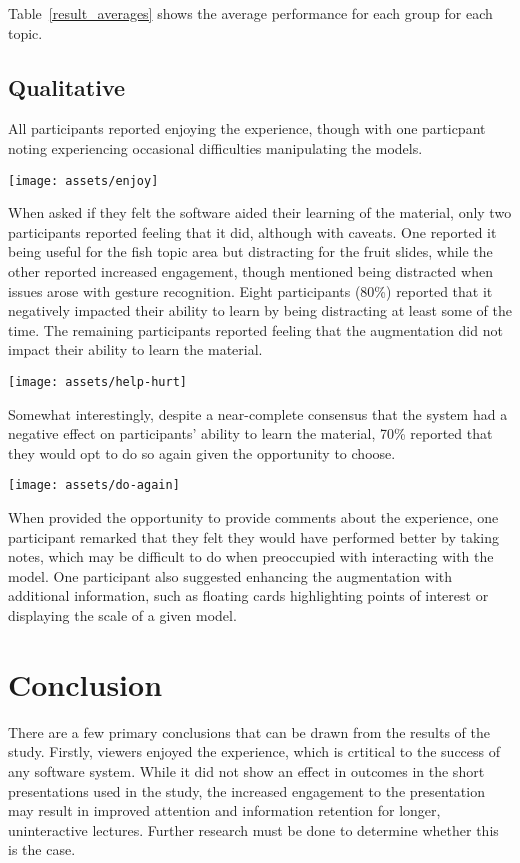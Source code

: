 \documentclass[10pt,journal]{IEEEtran}
\begin{document}
Table~\ref{result_averages} shows the average performance for each group for
each topic.

\subsection{Qualitative}

All participants reported enjoying the experience, though with one particpant
noting experiencing occasional difficulties manipulating the models.

\texttt{[image: assets/enjoy]}

When asked if they felt the software aided their learning of the material, only
two participants reported feeling that it did, although with caveats. One
reported it being useful for the fish topic area but distracting for the fruit
slides, while the other reported increased engagement, though mentioned being
distracted when issues arose with gesture recognition. Eight participants
(80\%) reported that it negatively impacted their ability to learn by being
distracting at least some of the time. The remaining participants reported
feeling that the augmentation did not impact their ability to learn the
material.

\texttt{[image: assets/help-hurt]}

Somewhat interestingly, despite a near-complete consensus that the system had a
negative effect on participants' ability to learn the material, 70\% reported
that they would opt to do so again given the opportunity to choose.

\texttt{[image: assets/do-again]}

When provided the opportunity to provide comments about the experience, one
participant remarked that they felt they would have performed better by taking
notes, which may be difficult to do when preoccupied with interacting with the
model. One participant also suggested enhancing the augmentation with
additional information, such as floating cards highlighting points of interest
or displaying the scale of a given model.

\section{Conclusion}

There are a few primary conclusions that can be drawn from the results of the
study. Firstly, viewers enjoyed the experience, which is crtitical to the
success of any software system. While it did not show an effect in outcomes in
the short presentations used in the study, the increased engagement to the
presentation may result in improved attention and information retention for
longer, uninteractive lectures. Further research must be done to determine
whether this is the case.
\end{document}
